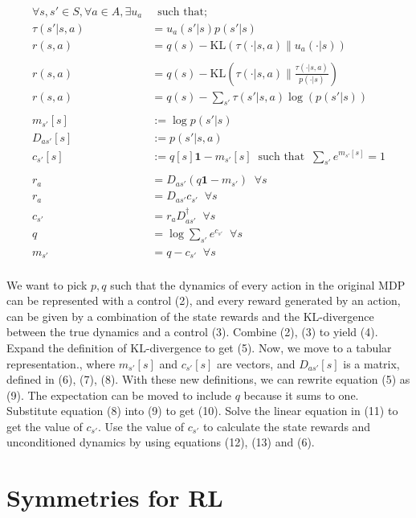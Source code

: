 \begin{align*}
\forall s, s' \in S, \forall a \in A, \exists u_a& \;\;\text{such that;} \tag{1}\\
\tau(s' | s, a) &= u_a(s'|s)p(s'|s) \tag{2}\\
r(s, a) &= q(s) - \text{KL}(\tau(\cdot | s, a) \parallel u_a(\cdot| s) ) \tag{3}\\
\\
r(s, a) &= q(s) - \text{KL}(\tau(\cdot | s, a)\parallel\frac{\tau(\cdot | s, a)}{p(\cdot|s)}) \tag{4}\\
r(s, a) &= q(s) - \sum_{s'}\tau(s' | s, a) \log(p(s'|s)) \tag{5}\\
\\
m_{s'}[s]&:= \log p(s' | s) \tag{6}\\
D_{as'}[s] &:= p(s'|s, a) \tag{7}\\
c_{s'}[s] &:= q[s] \mathbf 1 - m_{s'}[s] \;\;\text{such that} \;\; \sum_{s'} e^{m_{s'}[s]} = 1 \tag{8}\\
\\
r_a &= D_{as'} ( q \mathbf 1 - m_{s'}) \;\;\forall s \tag{9}\\
r_a &= D_{as'}c_{s'}  \;\;\forall s \tag{10}\\
c_{s'} &= r_aD_{as'}^{\dagger} \;\;\forall s\tag{11}\\
q &= \log \sum_{s'} e^{c_{s'}} \;\;\forall s\tag{12}\\
m_{s'} &= q - c_{s'} \;\;\forall s\tag{13}\\
\end{align*}

We want to pick $p, q$ such that the dynamics of every action in the original MDP can be represented with a control (2),
and every reward generated by an action, can be given by a combination of the
state rewards and the $\text{KL}$-divergence between the true dynamics and a control (3).
Combine (2), (3) to yield (4). Expand the definition of $\text{KL}$-divergence to get (5).
Now, we move to a tabular representation., where $m_{s'}[s]$ and $c_{s'}[s]$ are vectors, and
$D_{as'}[s]$ is a matrix, defined in (6), (7), (8). With these new definitions, we can rewrite equation (5)
as (9). The expectation can be moved to include $q$ because it sums to one.
Substitute equation (8) into (9) to get (10). Solve the linear equation in (11) to get the value of $c_{s'}$.
Use the value of $c_{s'}$ to calculate the state rewards and unconditioned dynamics by using equations (12), (13) and (6).

\section{Symmetries for RL}

